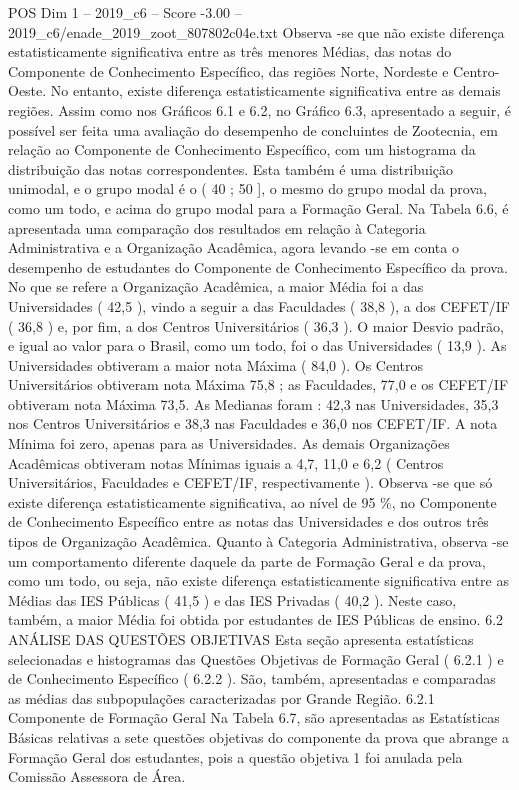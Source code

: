 \begin{textsample}{POS Dim 1 – 2019\_c6 – Score -3.00 – 2019\_c6/enade\_2019\_zoot\_807802c04e.txt}
Observa -se que não existe diferença estatisticamente significativa entre as três menores Médias, das notas do Componente de Conhecimento Específico, das regiões Norte, Nordeste e Centro-Oeste.
No entanto, existe diferença estatisticamente significativa entre as demais regiões.
Assim como nos Gráficos 6.1 e 6.2, no Gráfico 6.3, apresentado a seguir, é possível ser feita uma avaliação do desempenho de concluintes de Zootecnia, em relação ao Componente de Conhecimento Específico, com um histograma da distribuição das notas correspondentes.
Esta também é uma distribuição unimodal, e o grupo modal é o ( 40 ; 50 ], o mesmo do grupo modal da prova, como um todo, e acima do grupo modal para a Formação Geral.
Na Tabela 6.6, é apresentada uma comparação dos resultados em relação à Categoria Administrativa e a Organização Acadêmica, agora levando -se em conta o desempenho de estudantes do Componente de Conhecimento Específico da prova.
No que se refere a Organização Acadêmica, a maior Média foi a das Universidades ( 42,5 ), vindo a seguir a das Faculdades ( 38,8 ), a dos CEFET/IF ( 36,8 ) e, por fim, a dos Centros Universitários ( 36,3 ).
O maior Desvio padrão, e igual ao valor para o Brasil, como um todo, foi o das Universidades ( 13,9 ).
As Universidades obtiveram a maior nota Máxima ( 84,0 ).
Os Centros Universitários obtiveram nota Máxima 75,8 ; as Faculdades, 77,0 e os CEFET/IF obtiveram nota Máxima 73,5.
As Medianas foram : 42,3 nas Universidades, 35,3 nos Centros Universitários e 38,3 nas Faculdades e 36,0 nos CEFET/IF.
A nota Mínima foi zero, apenas para as Universidades.
As demais Organizações Acadêmicas obtiveram notas Mínimas iguais a 4,7, 11,0 e 6,2 ( Centros Universitários, Faculdades e CEFET/IF, respectivamente ).
Observa -se que só existe diferença estatisticamente significativa, ao nível de 95 \%, no Componente de Conhecimento Específico entre as notas das Universidades e dos outros três tipos de Organização Acadêmica.
Quanto à Categoria Administrativa, observa -se um comportamento diferente daquele da parte de Formação Geral e da prova, como um todo, ou seja, não existe diferença estatisticamente significativa entre as Médias das IES Públicas ( 41,5 ) e das IES Privadas ( 40,2 ).
Neste caso, também, a maior Média foi obtida por estudantes de IES Públicas de ensino. 6.2 ANÁLISE DAS QUESTÕES OBJETIVAS Esta seção apresenta estatísticas selecionadas e histogramas das Questões Objetivas de Formação Geral ( 6.2.1 ) e de Conhecimento Específico ( 6.2.2 ).
São, também, apresentadas e comparadas as médias das subpopulações caracterizadas por Grande Região. 6.2.1 Componente de Formação Geral Na Tabela 6.7, são apresentadas as Estatísticas Básicas relativas a sete questões objetivas do componente da prova que abrange a Formação Geral dos estudantes, pois a questão objetiva 1 foi anulada pela Comissão Assessora de Área.

\end{textsample}
